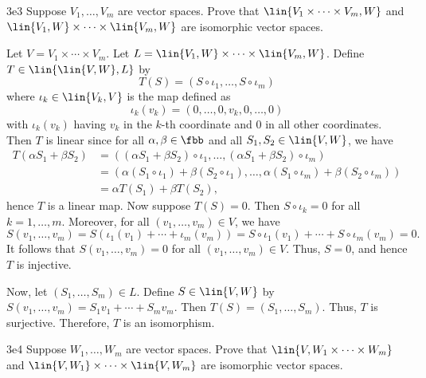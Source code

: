 \begin{exercise}{3e3}
    Suppose $V_1, \ldots, V_m$ are vector spaces.
	Prove that $\lin{V_1 \times \cdots \times V_m, W}$ and $\lin{V_1, W} \times \cdots \times \lin{V_m, W}$ are isomorphic vector spaces.
\end{exercise}

\begin{sol}
    Let $V = V_1 \times \cdots \times V_m$.
	Let $L = \lin{V_1, W} \times \cdots \times \lin{V_m, W}$.
	Define $T \in \lin{\lin{V, W}, L}$ by
    \[
    	T(S) = (S \circ \iota_1, \ldots, S \circ \iota_m)
    \]
    where $\iota_k \in \lin{V_k, V}$ is the map defined as
    \[
    	\iota_k(v_k) = (0, \ldots, 0, v_k, 0, \ldots, 0)
    \]
    with $\iota_k(v_k)$ having $v_k$ in the $k$-th coordinate and 0 in all other coordinates.
	Then $T$ is linear since for all $\alpha, \beta \in \fbb$ and all $S_1, S_2 \in \lin{V, W}$, we have
    \begin{align*}
        T(\alpha S_1 + \beta S_2) & = ((\alpha S_1 + \beta S_2) \circ \iota_1, \ldots, (\alpha S_1 + \beta S_2) \circ \iota_m) \\
        & = (\alpha (S_1 \circ \iota_1) + \beta (S_2 \circ \iota_1), \ldots, \alpha (S_1 \circ \iota_m) + \beta (S_2 \circ \iota_m)) \\
        & = \alpha T(S_1) + \beta T(S_2),
    \end{align*}
    hence $T$ is a linear map.
	Now suppose $T(S) = 0$.
	Then $S \circ \iota_k = 0$ for all $k = 1, \ldots, m$.
	Moreover, for all $(v_1, \ldots, v_m) \in V$, we have
    \[
    	S(v_1, \ldots, v_m) = S(\iota_1(v_1) + \cdots + \iota_m(v_m)) = S \circ \iota_1(v_1) + \cdots + S \circ \iota_m(v_m) = 0.
    \]
    It follows that $S(v_1, \ldots, v_m) = 0$ for all $(v_1, \ldots, v_m) \in V$.
	Thus, $S = 0$, and hence $T$ is injective.
    
    Now, let $(S_1, \ldots, S_m) \in L$.
	Define $S \in \lin{V, W}$ by $S(v_1, \ldots, v_m) = S_1 v_1 + \cdots + S_m v_m$.
	Then $T(S) = (S_1, \ldots, S_m)$.
	Thus, $T$ is surjective.
	Therefore, $T$ is an isomorphism.
\end{sol}

\begin{exercise}{3e4}
    Suppose $W_1, \ldots, W_m$ are vector spaces.
	Prove that $\lin{V, W_1 \times \cdots \times W_m}$ and $\lin{V, W_1} \times \cdots \times \lin{V, W_m}$ are isomorphic vector spaces.

\end{exercise}

